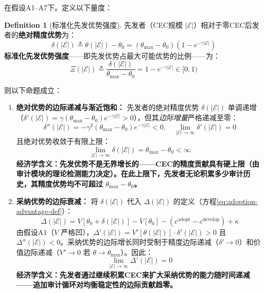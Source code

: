 \documentclass[12pt,a4paper]{ctexart}
\theoremstyle{definition}
\newtheorem{definition}{Definition}[section]
\theoremstyle{remark}
\begin{document}
\begin{corollary}
\label{cor:first-mover-decay}
在假设A1--A7下。定义以下量度：

\begin{definition}[标准化先发优势强度]
先发者（CEC规模 $|\mathcal{E}|$）相对于零CEC后发者的\textbf{绝对精度优势}为：
\begin{equation}
\delta(|\mathcal{E}|) \triangleq \theta(|\mathcal{E}|) - \theta_0 = (\theta_{\max} - \theta_0)(1 - e^{-\gamma |\mathcal{E}|})
\end{equation}
\textbf{标准化先发优势强度}——即先发优势占最大可能优势的比例——为：
\begin{equation}
\Xi(|\mathcal{E}|) \triangleq \frac{\delta(|\mathcal{E}|)}{\theta_{\max} - \theta_0} = 1 - e^{-\gamma |\mathcal{E}|} \in [0, 1)
\end{equation}
\end{definition}

则以下命题成立：

\begin{enumerate}[label=(\roman*), itemsep=6pt]
\item \textbf{绝对优势的边际递减与渐近饱和：} 先发者的绝对精度优势 $\delta(|\mathcal{E}|)$ 单调递增（$\delta'(|\mathcal{E}|) = \gamma(\theta_{\max} - \theta_0)e^{-\gamma |\mathcal{E}|} > 0$），但其\textit{边际增量}严格递减至零：
\begin{equation}
\delta''(|\mathcal{E}|) = -\gamma^2 (\theta_{\max} - \theta_0) e^{-\gamma |\mathcal{E}|} < 0, \quad \lim_{|\mathcal{E}| \to \infty} \delta'(|\mathcal{E}|) = 0
\end{equation}
且绝对优势收敛于有限上限：
\begin{equation}
\lim_{|\mathcal{E}| \to \infty} \delta(|\mathcal{E}|) = \theta_{\max} - \theta_0 < \infty
\end{equation}
\textbf{经济学含义：先发优势不是无界增长的——CEC的精度贡献具有硬上限（由审计模块的理论检测能力决定）。在此上限下，先发者无论积累多少审计历史，其精度优势均不可超过 $\theta_{\max} - \theta_0$。}

\item \textbf{采纳优势的边际衰减：} 将 $\delta(|\mathcal{E}|)$ 代入 $\Delta(|\mathcal{E}|)$ 的定义（方程\ref{eq:adoption-advantage-def}）：
\begin{equation}
\Delta(|\mathcal{E}|) = V[\theta_0 + \delta(|\mathcal{E}|)] - V[\theta_0] - (c^{\text{adopt}} - c^{\text{develop}}) + \kappa
\end{equation}
由假设A1（$V$ 严格凹），$\Delta'(|\mathcal{E}|) = V'[\theta(|\mathcal{E}|)] \cdot \delta'(|\mathcal{E}|) > 0$ 且 $\Delta''(|\mathcal{E}|) < 0$。采纳优势的边际增长同时受制于精度边际递减（$\delta' \to 0$）和价值边际递减（$V' \to 0$ 若 $\theta \to \theta_{\max}$）。因此：
\begin{equation}
\lim_{|\mathcal{E}| \to \infty} \Delta'(|\mathcal{E}|) = 0
\end{equation}
\textbf{经济学含义：先发者通过继续积累CEC来扩大采纳优势的能力随时间递减——追加审计循环对均衡稳定性的边际贡献趋零。}


\end{enumerate}
\end{corollary}
\end{document}
